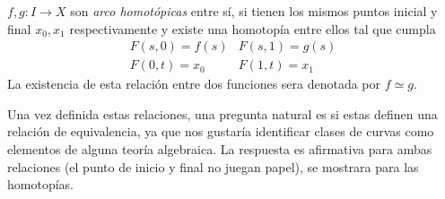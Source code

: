 \begin{definicion}
  \(f,g : I \to X\) son \emph{arco homotópicas} entre sí, si tienen los mismos
  puntos inicial y final \(x_0, x_1\) respectivamente y existe una homotopía entre
  ellos tal que cumpla
  \[
    \begin{matrix}
      F(s,0) = f(s) & F(s,1) = g(s) \\
      F(0,t) = x_0  & F(1,t) = x_1
    \end{matrix}
  \]
  La existencia de esta relación entre dos funciones sera denotada por
  \(f \simeq g\).
\end{definicion}
Una vez definida estas relaciones, una pregunta natural es si estas definen
una relación de equivalencia, ya que nos gustaría identificar clases de
curvas como elementos de alguna teoría algebraica. La respuesta es
afirmativa para ambas relaciones (el punto de inicio y final no juegan
papel), se mostrara para las homotopías.

